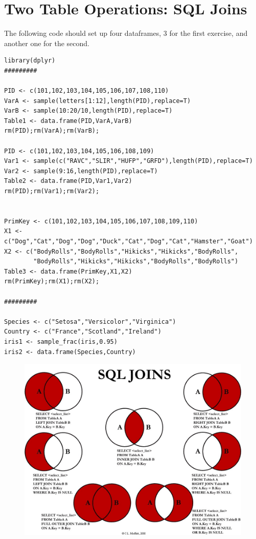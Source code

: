 \documentclass[a4paper,12pt]{article}
\begin{document}
\section*{Two Table Operations: SQL Joins}	
The following code should set up four dataframes, 3 for the first exercise, and another one for the second.
\begin{framed}
\begin{verbatim}
library(dplyr)
#########

PID <- c(101,102,103,104,105,106,107,108,110)
VarA <- sample(letters[1:12],length(PID),replace=T)
VarB <- sample(10:20/10,length(PID),replace=T)
Table1 <- data.frame(PID,VarA,VarB)
rm(PID);rm(VarA);rm(VarB);

PID <- c(101,102,103,104,105,106,108,109)
Var1 <- sample(c("RAVC","SLIR","HUFP","GRFD"),length(PID),replace=T)
Var2 <- sample(9:16,length(PID),replace=T)
Table2 <- data.frame(PID,Var1,Var2)
rm(PID);rm(Var1);rm(Var2);


PrimKey <- c(101,102,103,104,105,106,107,108,109,110)
X1 <- c("Dog","Cat","Dog","Dog","Duck","Cat","Dog","Cat","Hamster","Goat")
X2 <- c("BodyRolls","BodyRolls","Hikicks","Hikicks","BodyRolls",
        "BodyRolls","Hikicks","Hikicks","BodyRolls","BodyRolls")
Table3 <- data.frame(PrimKey,X1,X2)
rm(PrimKey);rm(X1);rm(X2);

#########

Species <- c("Setosa","Versicolor","Virginica")
Country <- c("France","Scotland","Ireland")
iris1 <- sample_frac(iris,0.95)
iris2 <- data.frame(Species,Country)
\end{verbatim}
\end{framed}
\newpage
\begin{figure}[h!]
	\centering
	\includegraphics[width=0.7\linewidth]{SQLjoins}
	\caption{}
	\label{fig:sqljoins}
\end{figure}
\end{document}
